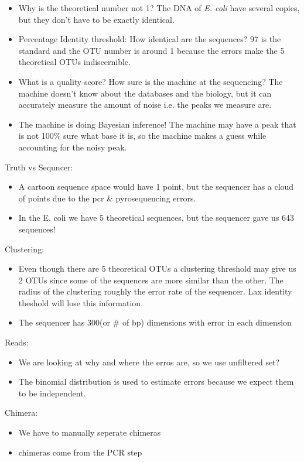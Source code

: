 \documentclass[../main.tex]{subfiles}
\begin{document}
\begin{itemize}
    \item Why is the theoretical number not 1? The DNA of \textit{E. coli} have several copies, but
    they don't have to be exactly identical.
    \item Percentage Identity threshold: How identical are the sequences? 97 is the standard and the
    OTU number is around 1 because the errors make the 5 theoretical OTUs indiscernible.
    \item What is a quality score? How sure is the machine at the sequencing? The machine doesn't
    know about the databases and the biology, but it can accurately measure the amount of noise i.e.
    the peaks we measure are.
    \item The machine is doing Bayesian inference! The machine may have a peak that is not 100\%
    sure what base it is, so the machine makes a guess while accounting for the noisy peak.
\end{itemize} 
Truth vs Sequncer:
\begin{itemize}
    \item A cartoon sequence space would have 1 point, but the sequencer has a cloud of points due
    to the pcr \& pyrosequencing errors.
    \item In the E. coli we have 5 theoretical sequences, but the sequencer gave us 643 sequences!
\end{itemize}
Clustering:
\begin{itemize}
    \item Even though there are 5 theoretical OTUs a clustering threshold may give us 2 OTUs since
    some of the sequences are more similar than the other. The radius of the clustering roughly the
    error rate of the sequencer. Lax identity theshold will lose this information.
    \item The sequencer has 300(or \# of bp) dimensions with error in each dimension
\end{itemize}
Reads:
\begin{itemize}
    \item We are looking at why and where the erros are, so we use unfiltered set?
    \item The binomial distribution is used to estimate errors because we expect them to be independent.
\end{itemize}
Chimera:
\begin{itemize}
    \item We have to manually seperate chimeras
    \item chimeras come from the PCR step
\end{itemize}
\end{document}
